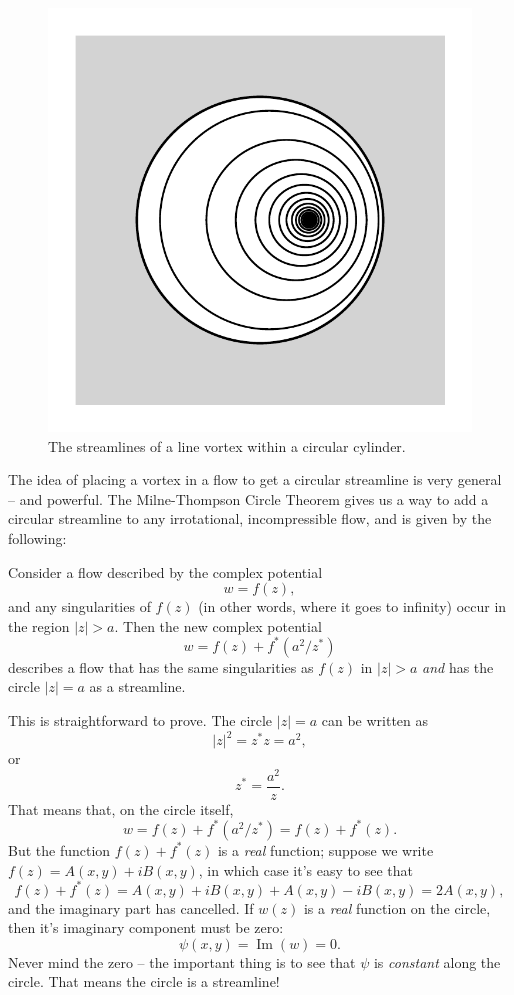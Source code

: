 
\begin{figure}
\centering\includegraphics[width=0.5\linewidth]{Figures/Chapter4/fig_vortex_cylinder}
\caption{The streamlines of a line vortex within a circular cylinder.}
\label{fig_vortex_cylinder}
\end{figure}

The idea of placing a vortex in a flow to get a circular streamline is very general -- and powerful.  The Milne-Thompson Circle Theorem gives us a way to add a circular streamline to any irrotational, incompressible flow, and is given by the following:
\begin{theorem}
Consider a flow described by the complex potential
\[
w = f(z),
\]
and any singularities of $f(z)$ (in other words, where it goes to infinity) occur in the region $|z| > a$.  Then the new complex potential
\begin{equation}
w = f(z) + f^*(a^2 / z^*)
\end{equation}
describes a flow that has the same singularities as $f(z)$ in $|z| > a$ \emph{and} has the circle $|z| = a$ as a streamline.
\end{theorem}

This is straightforward to prove.  The circle $|z| = a$ can be written as
\[
|z|^2 = z^* z = a^2,
\]
or
\[
z^* = \frac{a^2}{z}.
\]
That means that, on the circle itself,
\[
w = f(z) + f^*(a^2/z^*) = f(z) + f^*(z).
\]
But the function $f(z) + f^*(z)$ is a \emph{real} function; suppose we write $f(z) = A(x, y) + iB(x, y)$, in which case it's easy to see that 
\[
f(z) + f^*(z) = A(x, y) + iB(x,y) + A(x, y) - iB(x, y) = 2A(x, y),
\]
and the imaginary part has cancelled. If $w(z)$ is a \emph{real} function on the circle, then it's imaginary component must be zero:
\[
\psi(x, y) = \operatorname{Im}(w) = 0.
\]
Never mind the zero -- the important thing is to see that $\psi$ is \emph{constant} along the circle.  That means the circle is a streamline!

